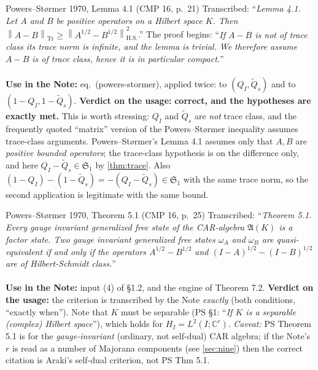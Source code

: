 \documentclass[11pt]{article}
\newcommand{\norm}[1]{\left\lVert #1\right\rVert}
\newcommand{\Sone}{\mathfrak S_1}
\begin{document}
\begin{citedbox}{Powers--St\o rmer 1970, Lemma 4.1 (CMP 16, p.~21)}
Transcribed: ``\emph{Lemma 4.1. Let $A$ and $B$ be positive operators on a
Hilbert space $K$. Then} $\norm{A-B}_{\mathrm{Tr}}\ge\norm{A^{1/2}-B^{1/2}}^2_{\mathrm{H.S.}}$.''
The proof begins: ``\emph{If $A-B$ is not of trace class its trace norm is
infinite, and the lemma is trivial. We therefore assume $A-B$ is of trace
class, hence it is in particular compact.}''\\[2pt]
\\[2pt]
\textbf{Use in the Note:} eq.~(powers-stormer), applied twice: to
$(Q_I,\widetilde Q_s)$ and to $(1-Q_I,1-\widetilde Q_s)$.
\textbf{Verdict on the usage:} \textbf{correct, and the hypotheses are exactly
met.} This is worth stressing: $Q_I$ and $\widetilde Q_s$ are \emph{not} trace
class, and the frequently quoted ``matrix'' version of the Powers--St\o rmer
inequality assumes trace-class arguments. Powers--St\o rmer's Lemma 4.1 assumes
only that $A,B$ are \emph{positive bounded operators}; the trace-class
hypothesis is on the difference only, and here $Q_I-\widetilde Q_s\in\Sone$ by
\cref{thm:trace}. Also $(1-Q_I)-(1-\widetilde Q_s)=-(Q_I-\widetilde Q_s)\in\Sone$
with the same trace norm, so the second application is legitimate with the same
bound.
\end{citedbox}

\begin{citedbox}{Powers--St\o rmer 1970, Theorem 5.1 (CMP 16, p.~25)}
Transcribed: ``\emph{Theorem 5.1. Every gauge invariant generalized free state of
the CAR-algebra $\mathfrak A(K)$ is a factor state. Two gauge invariant
generalized free states $\omega_A$ and $\omega_B$ are quasi-equivalent if and
only if the operators $A^{1/2}-B^{1/2}$ and $(I-A)^{1/2}-(I-B)^{1/2}$ are of
Hilbert-Schmidt class.}''\\[2pt]
\\[2pt]
\textbf{Use in the Note:} input (4) of \S1.2, and the engine of Theorem 7.2.
\textbf{Verdict on the usage:} the criterion is transcribed by the Note
\emph{exactly} (both conditions, ``exactly when''). Note that $K$ must be
separable (PS \S1: ``\emph{If $K$ is a separable (complex) Hilbert space}''),
which holds for $H_I=L^2(I;\mathbb C^r)$. \emph{Caveat:} PS Theorem 5.1 is for
the \emph{gauge-invariant} (ordinary, not self-dual) CAR algebra; if the Note's
$r$ is read as a number of Majorana components (see \cref{sec:nine}) then the
correct citation is Araki's self-dual criterion, not PS Thm 5.1.
\end{citedbox}
\end{document}
